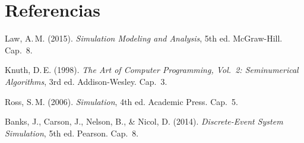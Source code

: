 \documentclass[11pt, letterpaper]{article}
\begin{document}
\section*{Referencias}
\begin{enumerate}[label={[\arabic*]}]
    \item Law, A.\,M. (2015). \textit{Simulation Modeling and Analysis}, 5th ed. McGraw-Hill. Cap.~8.
    \item Knuth, D.\,E. (1998). \textit{The Art of Computer Programming, Vol.~2: Seminumerical Algorithms}, 3rd ed. Addison-Wesley. Cap.~3.
    \item Ross, S.\,M. (2006). \textit{Simulation}, 4th ed. Academic Press. Cap.~5.
    \item Banks, J., Carson, J., Nelson, B., \& Nicol, D. (2014). \textit{Discrete-Event System Simulation}, 5th ed. Pearson. Cap.~8.
\end{enumerate}
\end{document}
